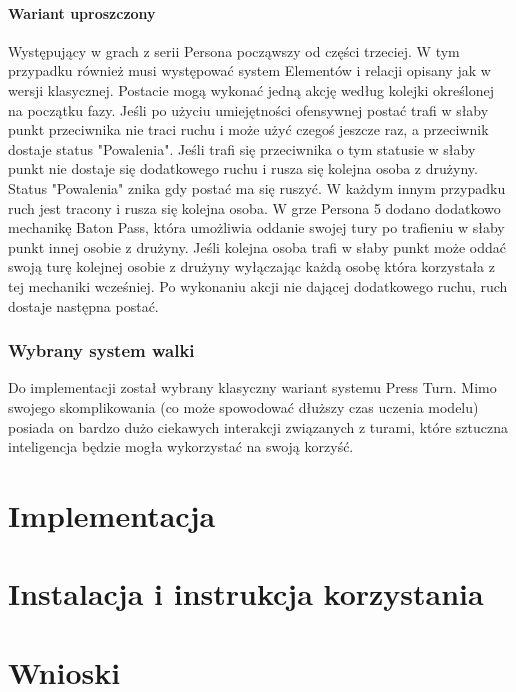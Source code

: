 \documentclass{SGGW-thesis}
\begin{document}
\subsubsection{Wariant uproszczony}
Występujący w grach z serii Persona począwszy od części trzeciej. W tym przypadku również musi występować system Elementów i relacji opisany jak w wersji klasycznej. Postacie mogą wykonać jedną akcję według kolejki określonej na początku fazy. Jeśli po użyciu umiejętności ofensywnej postać trafi w słaby punkt przeciwnika
nie traci ruchu i może użyć czegoś jeszcze raz, a przeciwnik dostaje status "Powalenia". Jeśli trafi się przeciwnika o tym statusie w słaby punkt nie dostaje się dodatkowego ruchu i rusza się kolejna osoba z drużyny. Status "Powalenia" znika gdy postać ma się ruszyć. W każdym innym przypadku ruch jest tracony i rusza się kolejna osoba. 
W grze Persona 5 dodano dodatkowo mechanikę Baton Pass, która umożliwia oddanie swojej tury po trafieniu w słaby punkt innej osobie z drużyny. Jeśli kolejna osoba trafi w słaby punkt może oddać swoją turę kolejnej osobie z drużyny wyłączając każdą osobę która korzystała z tej mechaniki wcześniej. Po wykonaniu akcji nie dającej dodatkowego ruchu, 
ruch dostaje następna postać.


\subsection*{Wybrany system walki}
Do implementacji został wybrany klasyczny wariant systemu Press Turn. Mimo swojego skomplikowania (co może spowodować dłuższy czas uczenia modelu) posiada on bardzo dużo ciekawych interakcji związanych z turami, które sztuczna inteligencja będzie mogła wykorzystać na swoją korzyść.


\chapter{Implementacja}


\chapter{Instalacja i instrukcja korzystania}


\chapter{Wnioski}
\end{document}
